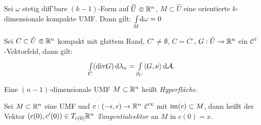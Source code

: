 \documentclass{cheat-sheet}
\newcommand{\Cont}{\mathcal{C}} %
\theoremstyle{definition}
\newcommand{\Intdf}[2]{{\textstyle \int\limits_{#1}} #2} %
\begin{document}
\iffalse
\begin{satz}[Stokes]
  Gegeben sei
  \begin{itemize}
    \item $M \subset \R^n$ $k$-dimensionale Untermannigfaltigkeit
    \item $\widehat{U} \opn \R^n$, $M \subset \widehat{U}$
    \item $\omega$ stetig diff'bare $(k{-}1)$-Form auf $\widehat{U}$.
    \item $C \subset M$ Kompaktum mit glattem Rand $\partial_M C$.
  \end{itemize}
  Dann gilt (bzgl. der induzierten Orientierung auf $\partial_M C$)
\end{satz}
\fi



\begin{kor}
  Sei $\omega$ stetig diff'bare $(k{-}1)$-Form auf $\widehat{U} \opn \R^n$, $M \subset \widehat{U}$ eine orientierte $k$-dimensionale kompakte UMF.
  Dann gilt: $\Intdf{M}{\d \omega} = 0$
\end{kor}



\begin{satz}
  Sei $C \subset \hat{U} \opn \R^n$ kompakt mit glattem Rand, $C^\circ \not= \emptyset$, $C = \overline{C^\circ}$, $G : \hat{U} \to \mathbb{R}^n$ ein $\Cont^1$-Vektorfeld, dann gilt:
  \[ {\textstyle \int\limits_{C}^{}} (\mathrm{div} G) \,\mathrm{d} \lambda_n = {\textstyle \int\limits_{\partial_C}^{}} \langle G, \nu \rangle \,\mathrm{d} \mathcal{A}. \]
\end{satz}


\begin{defn}
  Eine $(n{-}1)$-dimensionale UMF $M \subset \R^n$ heißt \emph{Hyperfläche}.
\end{defn}



\begin{defn}
  Sei $M \subset \R^n$ eine UMF und $c : \left( -\epsilon, \epsilon \right) \to \mathbb{R}^n$ $\Cont^\infty$ mit $\operatorname{im}(c) \subset M$, dann heißt der Vektor $(c(0), c'(0)) \in T_{c(0)} \mathbb{R}^n$ \emph{Tangentialvektor} an $M$ in $c(0) = x$.
\end{defn}
\end{document}
